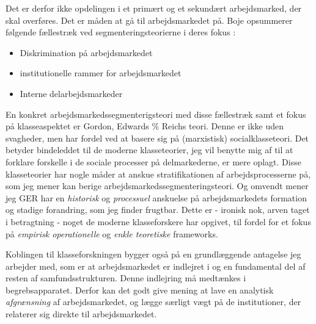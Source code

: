 Det er derfor ikke opdelingen i et primært og et sekundært arbejdsmarked, der skal overføres. Det er måden at gå til arbejdsmarkedet på. Boje opsummerer følgende fællestræk ved segmenteringsteorierne i deres fokus \parencite[106]{BojeToft1989}:  
%
\begin{itemize}
\itemsep-0.7em  
  	\item Diskrimination på arbejdsmarkedet
  	\item institutionelle rammer for arbejdsmarkedet
	\item Interne delarbejdsmarkeder
\end{itemize}
%

En konkret arbejdsmarkedssegmenterigsteori med disse fællestræk samt et fokus på klasseaspektet er Gordon, Edwards \% Reichs teori. Denne er ikke uden svagheder, men har fordel ved at basere sig på (marxistisk) socialklasseteori. Det betyder bindeleddet til de moderne klasseteorier, jeg vil benytte mig af til at forklare forskelle i de sociale processer på delmarkederne, er mere oplagt. Disse klasseteorier har nogle måder at anskue stratifikationen af arbejdsprocesserne på, som jeg mener kan berige arbejdsmarkedssegmenteringsteori. Og omvendt mener jeg GER har en \emph{historisk} og \emph{processuel} anskuelse på arbejdsmarkedets formation og stadige forandring, som jeg finder frugtbar. Dette er - ironisk nok, arven taget i betragtning - noget de moderne klasseforskere har opgivet, til fordel for et fokus på \emph{empirisk operationelle} og \emph{enkle teoretiske} frameworks.

Koblingen til klasseforskningen bygger også på en grundlæggende antagelse jeg arbejder med, som er at arbejdsmarkedet er indlejret i og en fundamental del af resten af samfundsstrukturen. Denne indlejring må medtænkes i begrebsapparatet. Derfor kan det godt give mening at lave en analytisk \emph{afgrænsning} af arbejdsmarkedet, og lægge særligt vægt på de institutioner, der relaterer sig direkte til arbejdsmarkedet. 

